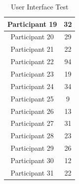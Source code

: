 \begin{table}[htbp]
\begin{tabular}{|c|c|}
    Participant 19             & 32                                \\ \hline
    Participant 20             & 29                                \\ \hline
    Participant 21             & 22                                \\ \hline
    Participant 22             & 94                                \\ \hline
    Participant 23             & 19                                \\ \hline
    Participant 24             & 34                                \\ \hline
    Participant 25             & 9                                \\ \hline
    Participant 26             & 13                                \\ \hline
    Participant 27             & 31                                \\ \hline
    Participant 28             & 23                                \\ \hline
    Participant 29             & 26                                \\ \hline
    Participant 30             & 12                                \\ \hline
    Participant 31             & 22                                  \\ \hline
    \end{tabular}
    \caption*{User Interface Test}
    \label{fig:heatmapTimes}
    \end{table}


